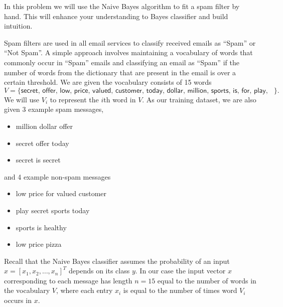 \documentclass[twoside,10pt]{article}
\begin{document}
\begin{enumerate}
In this problem we will use the Naive Bayes algorithm to fit a spam filter by hand. This will enhance your understanding to Bayes classifier and build intuition. 

Spam filters are used in all email services to classify received emails as ``Spam'' or ``Not Spam''. A simple approach involves maintaining a vocabulary of words that commonly occur in ``Spam'' emails and classifying an email as ``Spam'' if the number of words from the dictionary that are present in the email is over a certain threshold.
We are given the vocabulary consists of 15 words \[V=\{\textsf{secret, offer, low, price, valued, customer, today, dollar, million, sports, is, for, play, healthy, pizza}\}.\] We will use $V_i$ to represent the $i$th word in $V$. As our training dataset, we are also given 3 example spam messages,
\begin{itemize}
\item \textsf{million dollar offer}
\item \textsf{secret offer today}
\item \textsf{secret is secret}
\end{itemize}
and 4 example non-spam messages
\begin{itemize}
\item \textsf{low price for valued customer}
\item \textsf{play secret sports today}
\item \textsf{sports is healthy}
\item \textsf{low price pizza}
\end{itemize}

Recall that the Naive Bayes classifier assumes the probability of an input $x = [x_1, x_2, \ldots, x_n]^T$ depends on its class $y$. In our case the input vector $x$ corresponding to each message has length $n = 15$ equal to the number of words in the vocabulary $V$, where each entry $x_i$ is equal to the number of times word $V_i$ occurs in $x$.


\end{enumerate}
\end{document}
